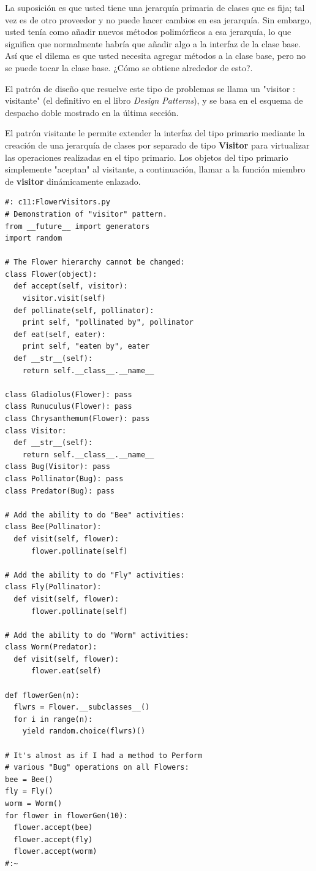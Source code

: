 \documentclass{article}
\begin{document}
La suposición es que usted tiene una jerarquía primaria de clases que es fija; tal vez es de otro proveedor y no puede hacer cambios en esa jerarquía. Sin embargo, usted tenía como añadir nuevos métodos polimórficos a esa jerarquía, lo que significa que normalmente habría que añadir algo a la interfaz de la clase base. Así que el dilema es que usted necesita agregar métodos a la clase base, pero no se puede tocar la clase base. ¿Cómo se obtiene alrededor de esto?.     \newline

El patrón de diseño que resuelve este tipo de problemas se llama un "visitor : visitante" (el definitivo en el libro \textit{Design Patterns}), y se basa en el esquema de despacho doble mostrado en la última sección.    \newline

El patrón visitante le permite extender la interfaz del tipo primario mediante la creación de una jerarquía de clases por separado de tipo \textbf{Visitor} para virtualizar las operaciones realizadas en el tipo primario. Los objetos del tipo primario simplemente "aceptan" al visitante, a continuación, llamar a la función miembro de \textbf{visitor} dinámicamente enlazado.   \newline

\begin{lstlisting} 
#: c11:FlowerVisitors.py 
# Demonstration of "visitor" pattern. 
from __future__ import generators 
import random 

# The Flower hierarchy cannot be changed: 
class Flower(object):   
  def accept(self, visitor): 
    visitor.visit(self) 
  def pollinate(self, pollinator): 
    print self, "pollinated by", pollinator 
  def eat(self, eater): 
    print self, "eaten by", eater 
  def __str__(self):  
    return self.__class__.__name__
    
class Gladiolus(Flower): pass 
class Runuculus(Flower): pass 
class Chrysanthemum(Flower): pass  
class Visitor: 
  def __str__(self):  
    return self.__class__.__name__ 
class Bug(Visitor): pass 
class Pollinator(Bug): pass 
class Predator(Bug): pass 

# Add the ability to do "Bee" activities: 
class Bee(Pollinator): 
  def visit(self, flower): 
      flower.pollinate(self) 
      
# Add the ability to do "Fly" activities: 
class Fly(Pollinator): 
  def visit(self, flower): 
      flower.pollinate(self) 
      
# Add the ability to do "Worm" activities: 
class Worm(Predator): 
  def visit(self, flower): 
      flower.eat(self) 
      
def flowerGen(n): 
  flwrs = Flower.__subclasses__() 
  for i in range(n): 
    yield random.choice(flwrs)() 
    
# It's almost as if I had a method to Perform 
# various "Bug" operations on all Flowers: 
bee = Bee() 
fly = Fly() 
worm = Worm() 
for flower in flowerGen(10): 
  flower.accept(bee) 
  flower.accept(fly) 
  flower.accept(worm) 
#:~ 
\end{lstlisting}
\end{document}
